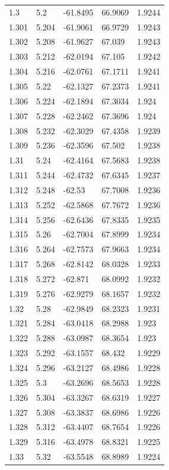 \begin{tabular}{lllll}
1.3 & 5.2 & -61.8495 & 66.9069 & 1.9244 \\
1.301 & 5.204 & -61.9061 & 66.9729 & 1.9243 \\
1.302 & 5.208 & -61.9627 & 67.039 & 1.9243 \\
1.303 & 5.212 & -62.0194 & 67.105 & 1.9242 \\
1.304 & 5.216 & -62.0761 & 67.1711 & 1.9241 \\
1.305 & 5.22 & -62.1327 & 67.2373 & 1.9241 \\
1.306 & 5.224 & -62.1894 & 67.3034 & 1.924 \\
1.307 & 5.228 & -62.2462 & 67.3696 & 1.924 \\
1.308 & 5.232 & -62.3029 & 67.4358 & 1.9239 \\
1.309 & 5.236 & -62.3596 & 67.502 & 1.9238 \\
1.31 & 5.24 & -62.4164 & 67.5683 & 1.9238 \\
1.311 & 5.244 & -62.4732 & 67.6345 & 1.9237 \\
1.312 & 5.248 & -62.53 & 67.7008 & 1.9236 \\
1.313 & 5.252 & -62.5868 & 67.7672 & 1.9236 \\
1.314 & 5.256 & -62.6436 & 67.8335 & 1.9235 \\
1.315 & 5.26 & -62.7004 & 67.8999 & 1.9234 \\
1.316 & 5.264 & -62.7573 & 67.9663 & 1.9234 \\
1.317 & 5.268 & -62.8142 & 68.0328 & 1.9233 \\
1.318 & 5.272 & -62.871 & 68.0992 & 1.9232 \\
1.319 & 5.276 & -62.9279 & 68.1657 & 1.9232 \\
1.32 & 5.28 & -62.9849 & 68.2323 & 1.9231 \\
1.321 & 5.284 & -63.0418 & 68.2988 & 1.923 \\
1.322 & 5.288 & -63.0987 & 68.3654 & 1.923 \\
1.323 & 5.292 & -63.1557 & 68.432 & 1.9229 \\
1.324 & 5.296 & -63.2127 & 68.4986 & 1.9228 \\
1.325 & 5.3 & -63.2696 & 68.5653 & 1.9228 \\
1.326 & 5.304 & -63.3267 & 68.6319 & 1.9227 \\
1.327 & 5.308 & -63.3837 & 68.6986 & 1.9226 \\
1.328 & 5.312 & -63.4407 & 68.7654 & 1.9226 \\
1.329 & 5.316 & -63.4978 & 68.8321 & 1.9225 \\
1.33 & 5.32 & -63.5548 & 68.8989 & 1.9224 \\

\end{tabular}
